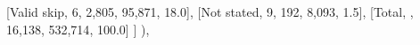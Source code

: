\documentclass[
  11pt,
  a4paper,
]{article}
\newenvironment{Shaded}{\begin{snugshade}}{\end{snugshade}}
\newcommand{\NormalTok}[1]{\textcolor[rgb]{0.00,0.23,0.31}{#1}}
\newcommand{\StringTok}[1]{\textcolor[rgb]{0.13,0.47,0.30}{#1}}
\begin{document}
\begin{Shaded}
\begin{Highlighting}[]
\NormalTok{            [}\StringTok{\textquotesingle{}Valid skip\textquotesingle{}}\NormalTok{, }\StringTok{\textquotesingle{}6\textquotesingle{}}\NormalTok{, }\StringTok{\textquotesingle{}2,805\textquotesingle{}}\NormalTok{, }\StringTok{\textquotesingle{}95,871\textquotesingle{}}\NormalTok{, }\StringTok{\textquotesingle{}18.0\textquotesingle{}}\NormalTok{],}
\NormalTok{            [}\StringTok{\textquotesingle{}Not stated\textquotesingle{}}\NormalTok{, }\StringTok{\textquotesingle{}9\textquotesingle{}}\NormalTok{, }\StringTok{\textquotesingle{}192\textquotesingle{}}\NormalTok{, }\StringTok{\textquotesingle{}8,093\textquotesingle{}}\NormalTok{, }\StringTok{\textquotesingle{}1.5\textquotesingle{}}\NormalTok{],}
\NormalTok{            [}\StringTok{\textquotesingle{}Total\textquotesingle{}}\NormalTok{, }\StringTok{\textquotesingle{}\textquotesingle{}}\NormalTok{, }\StringTok{\textquotesingle{}16,138\textquotesingle{}}\NormalTok{, }\StringTok{\textquotesingle{}532,714\textquotesingle{}}\NormalTok{, }\StringTok{\textquotesingle{}100.0\textquotesingle{}}\NormalTok{]}
\NormalTok{        ]}
\NormalTok{    ),}


\end{Highlighting}
\end{Shaded}
\end{document}
